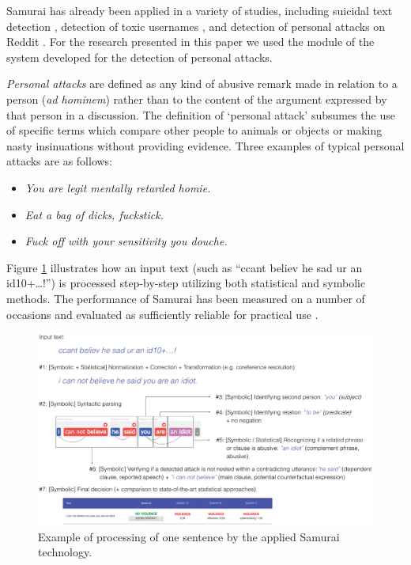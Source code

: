 \documentclass[preprint,12pt]{elsarticle}
\begin{document}
Samurai has already been applied in a variety of studies, including suicidal text detection \citep{ijerph182211759}, detection of toxic usernames \citep{URBANIAK2022107371}, and detection of personal attacks on Reddit \citep{urbaniak2022personal}. For the  research presented in this paper we used the module of the system developed for the detection of personal attacks. 



\textit{Personal attacks} are defined as any
kind of abusive remark made in relation to a person
(\textit{ad hominem}) rather than to the content of the argument
expressed by that person in a discussion. The definition of `personal
attack' subsumes the use of specific terms which compare other people to
animals or objects or making nasty insinuations without providing
evidence. Three examples of typical personal attacks are as follows:

\begin{itemize} 
\item \emph{You are legit mentally retarded homie.}
\item \emph {Eat a bag of dicks, fuckstick.}
\item \emph {Fuck off with your sensitivity you douche.} 
\end{itemize}



Figure \ref{fig:samuraiexample} illustrates how an  input text (such as ``ccant
believ he sad ur an id10+\ldots!'') is processed step-by-step utilizing
both statistical and symbolic methods. The performance of Samurai has been measured on a number of occasions and evaluated as sufficiently reliable for practical use \citep{ptaszynski2018cyberbullying,ijerph182211759,urbaniak2022personal,URBANIAK2022107371}.

\begin{figure}[t]
    \centering
    \includegraphics[width=\linewidth]{example.eps}
    \caption{Example of processing of one sentence by the applied Samurai technology.}
    \label{fig:samuraiexample}
\end{figure}
\end{document}
